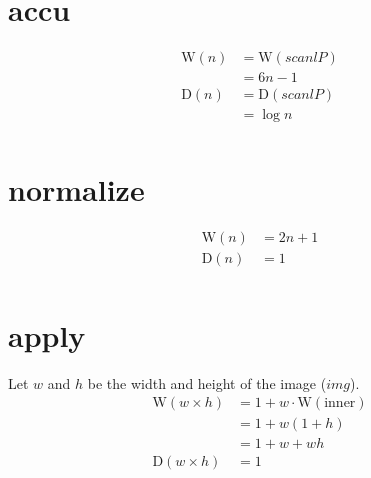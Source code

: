 \documentclass{article}
\newcommand{\W}[0]{\textrm{W}}
\newcommand{\D}[0]{\textrm{D}}
\begin{document}
    \section{accu}
      \begin{equation}
      \begin{split}
      \W(n) & = \W(scanlP) \\
            & = 6n - 1 \\
      \D(n) & = \D(scanlP) \\
            & = \log n \\
      \end{split}
      \end{equation}
      
    \section{normalize}
      \begin{equation}
      \begin{split}
      \W(n) & = 2n + 1 \\
      \D(n) & = 1 \\
      \end{split}
      \end{equation}
      
    \section{apply}
      Let $w$ and $h$ be the width and height of the image ($img$).
      \begin{equation}
      \begin{split}
      \W(w \times h) & = 1 + w \cdot \W(\textrm{inner}) \\
            & = 1 + w(1 + h)  \\
            & = 1 + w + wh \\
      \D(w \times h) & = 1 \\
      \end{split}
      \end{equation}

    
\end{document}
